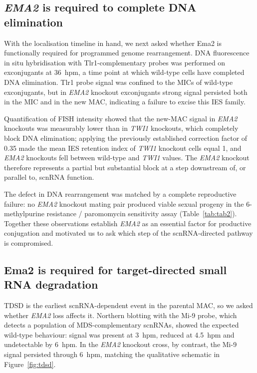 \documentclass[11pt]{article}
\begin{document}
\subsection{\emph{EMA2} is required to complete DNA elimination}

With the localisation timeline in hand, we next asked whether Ema2 is
functionally required for programmed genome rearrangement. DNA
fluorescence in situ hybridisation with Tlr1-complementary probes
\citep{cheng2010transposase} was performed on exconjugants at 36~hpm, a
time point at which wild-type cells have completed DNA elimination.
Tlr1 probe signal was confined to the MICs of wild-type exconjugants, but
in \emph{EMA2} knockout exconjugants strong signal persisted both in the
MIC and in the new MAC, indicating a failure to excise this IES family.

Quantification of FISH intensity showed that the new-MAC signal in
\emph{EMA2} knockouts was measurably lower than in \emph{TWI1} knockouts,
which completely block DNA elimination; applying the previously
established correction factor of 0.35 made the mean IES retention index
of \emph{TWI1} knockout cells equal 1, and \emph{EMA2} knockouts fell
between wild-type and \emph{TWI1} values. The \emph{EMA2} knockout
therefore represents a partial but substantial block at a step downstream
of, or parallel to, scnRNA function.

The defect in DNA rearrangement was matched by a complete reproductive
failure: no \emph{EMA2} knockout mating pair produced viable sexual
progeny in the 6-methylpurine resistance / paromomycin sensitivity assay
(Table~\ref{tab:tab2}). Together these observations establish \emph{EMA2}
as an essential factor for productive conjugation and motivated us to
ask which step of the scnRNA-directed pathway is compromised.

\subsection{Ema2 is required for target-directed small RNA degradation}

TDSD is the earliest scnRNA-dependent event in the parental MAC, so we
asked whether \emph{EMA2} loss affects it. Northern blotting with the
Mi-9 probe, which detects a population of MDS-complementary scnRNAs,
showed the expected wild-type behaviour: signal was present at 3~hpm,
reduced at 4.5~hpm and undetectable by 6~hpm. In the \emph{EMA2} knockout
cross, by contrast, the Mi-9 signal persisted through 6~hpm, matching
the qualitative schematic in Figure~\ref{fig:tdsd}.
\end{document}
